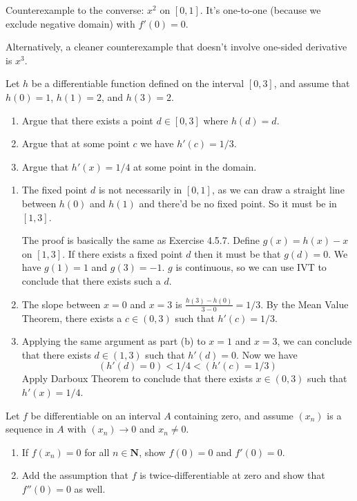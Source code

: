 \documentclass{oxmathproblems}
\begin{document}
\begin{questions}
\begin{solution}
  Counterexample to the converse: $x^2$ on $[0, 1]$. It's one-to-one (because we exclude negative domain) with $f'(0)=0$.

  Alternatively, a cleaner counterexample that doesn't involve one-sided derivative is $x^3$.
\end{solution}

\miquestion Let $h$ be a differentiable function defined on the interval $[0, 3]$, and assume that $h(0)=1$, $h(1)=2$, and $h(3)=2$.
\begin{enumerate}[label=(\alph*)]
  \item Argue that there exists a point $d \in [0, 3]$ where $h(d)=d$.
  \item Argue that at some point $c$ we have $h'(c)=1/3$.
  \item Argue that $h'(x)=1/4$ at some point in the domain.
\end{enumerate}

\begin{solution}
  \begin{enumerate}[label=(\alph*)]
    \item The fixed point $d$ is not necessarily in $[0, 1]$, as we can draw a straight line between $h(0)$ and $h(1)$ and there'd be no fixed point. So it must be in $[1, 3]$.
    
    The proof is basically the same as Exercise 4.5.7. Define $g(x)=h(x)-x$ on $[1, 3]$. If there exists a fixed point $d$ then it must be that $g(d)=0$.
    We have $g(1)=1$ and $g(3)=-1$. $g$ is continuous, so we can use IVT to conclude that there exists such a $d$.
    
    \item The slope between $x=0$ and $x=3$ is $\frac{h(3)-h(0)}{3-0}=1/3$. By the Mean Value Theorem, there exists a $c \in (0, 3)$ such that $h'(c)=1/3$. 
    
    \item Applying the same argument as part (b) to $x=1$ and $x=3$, we can conclude that there exists $d \in (1, 3)$ such that $h'(d)=0$.
    Now we have 
    \[(h'(d)=0) < 1/4 < (h'(c)=1/3)\]
    Apply Darboux Theorem to conclude that there exists $x \in (0, 3)$ such that $h'(x)=1/4$.
  \end{enumerate}
\end{solution}

\miquestion Let $f$ be differentiable on an interval $A$ containing zero, and assume $(x_{n})$ is a sequence in $A$ with $(x_{n}) \to 0$ and $x_{n} \neq 0$.
\begin{enumerate}[label=(\alph*)]
  \item If $f(x_{n})=0$ for all $n \in \textbf{N}$, show $f(0)=0$ and $f'(0)=0$.
  \item Add the assumption that $f$ is twice-differentiable at zero and show that $f''(0)=0$ as well.
\end{enumerate}


\end{questions}
\end{document}
